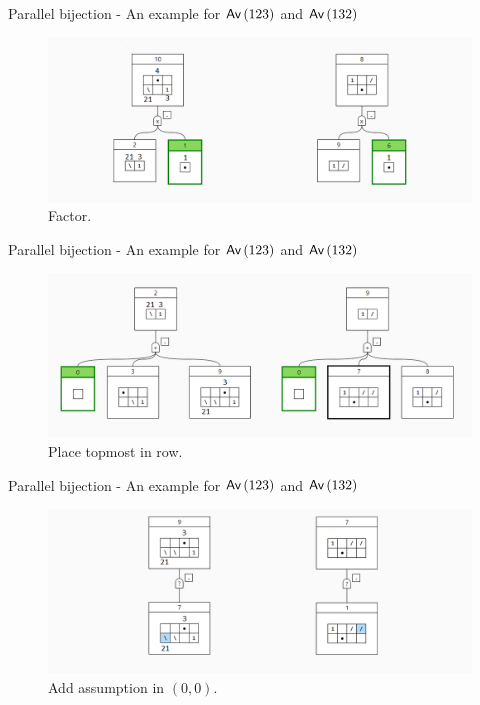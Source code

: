 \begin{frame}{Parallel bijection - An example for $\textsf{Av}\left(123\right)$ and $\textsf{Av}\left(132\right)$}
    \begin{figure}
        \centering
        \includegraphics[scale=0.4]{graphics/step02.png}
        \caption{Factor.}
    \end{figure}
\end{frame}


\begin{frame}{Parallel bijection - An example for $\textsf{Av}\left(123\right)$ and $\textsf{Av}\left(132\right)$}
    \begin{figure}
        \centering
        \includegraphics[scale=0.4]{graphics/step03.png}
        \caption{Place topmost in row.}
    \end{figure}
\end{frame}

\begin{frame}{Parallel bijection - An example for $\textsf{Av}\left(123\right)$ and $\textsf{Av}\left(132\right)$}
    \begin{figure}
        \centering
        \includegraphics[scale=0.4]{graphics/step04.png}
        \caption{Add assumption in $(0,0)$.}
    \end{figure}
\end{frame}

